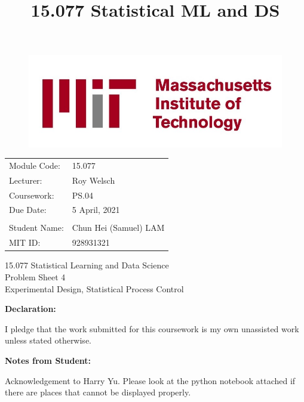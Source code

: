\documentclass[11pt]{article}
\title{15.077 Statistical ML and DS}
\begin{document}
    \begin{figure}
\includegraphics[scale=0.5]{MIT-Logo-(2).jpg}
\end{figure}

\begin{flushright}
\begin{tabular}{ll}
Module Code:     & 15.077                \\
Lecturer:        & Roy Welsch         \\
Coursework:      & PS.04                     \\
Due Date:        & 5 April, 2021      \\ \\
Student Name:    & Chun Hei (Samuel) LAM          \\
MIT ID:          & 928931321              
\end{tabular}
\end{flushright}

\vspace{2cm}

\begin{center}
    \huge 15.077 Statistical Learning and Data Science \\
    \vspace{0.7cm}
    \Large Problem Sheet 4 \\
    \vspace{0.5cm}
    \Large Experimental Design, Statistical Process Control
    \normalsize
\end{center}

\vspace{1.5cm}

\noindent \textbf{Declaration:}
\begin{tcolorbox}
I pledge that the work submitted for this coursework is my own unassisted work unless stated otherwise.
\end{tcolorbox}
    
\noindent \textbf{Notes from Student:}
\begin{tcolorbox}
Acknowledgement to Harry Yu. Please look at the python notebook attached if there are places that cannot be displayed properly.
\end{tcolorbox}
\newpage
\end{document}
